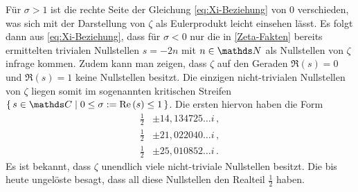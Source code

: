 Für $\sigma > 1$ ist die rechte Seite der Gleichung \eqref{eq:Xi-Beziehung} von $0$ verschieden, was sich mit der Darstellung von $\zeta$ als Eulerprodukt leicht einsehen lässt. Es folgt dann aus \eqref{eq:Xi-Beziehung}, dass für $\sigma < 0$ nur die in \autoref{Zeta-Fakten} bereits ermittelten \glqq{}trivialen Nullstellen\grqq{} $s = -2n$ mit $n \in \NN$ als Nullstellen von $\zeta$ infrage kommen. Zudem kann man zeigen, dass $\zeta$ auf den Geraden $\Re(s) = 0$ und $\Re(s) = 1$ keine Nullstellen besitzt. Die einzigen \glqq{}nicht-trivialen\grqq{} Nullstellen von $\zeta$ liegen somit im sogenannten \glqq{}kritischen Streifen\grqq{} $\Set {s \in \CC \mid 0 \leq \sigma := \Re(s) \leq 1}$. Die \glqq{}ersten\grqq{} hiervon haben die Form
\begin{align*}
	\tfrac 12 &\pm 14,134725\ldots i \,, \\
	\tfrac 12 &\pm 21,022040\ldots i \,, \\
	\tfrac 12 &\pm 25,010852\ldots i \,.
\end{align*}
Es ist bekannt, dass $\zeta$ unendlich viele nicht-triviale Nullstellen besitzt. Die bis heute ungelöste  besagt, dass all diese Nullstellen den Realteil $\frac 12$ haben.